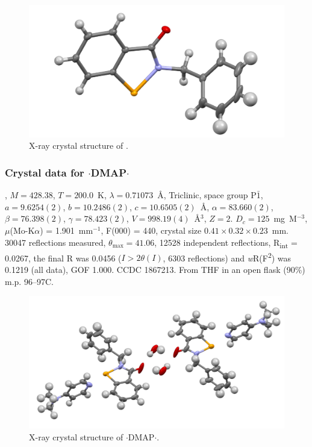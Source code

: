 \begin{refsection}
\begin{figure}
  \includegraphics[width=0.6\linewidth]{Figures/ebs-bn-xtal.pdf}
  \caption{X-ray crystal structure of \texorpdfstring{}{C14H11NOSe}.}
\end{figure}

\subsubsection{Crystal data for \texorpdfstring{$\cdot$DMAP$\cdot$}{C21H21N3OSe.(H2O)}}
, $M=428.38$, $T=200.0$~K, $\lambda=0.71073$~\AA, Triclinic, space group P$\bar{1}$, $a = 9.6254(2)$, $b = 10.2486(2)$, $c = 10.6505(2)$~\AA, $\alpha = 83.660(2)$\degree, $\beta = 76.398(2)$\degree, $\gamma = 78.423(2)$\degree, $V = 998.19(4)$~\AA$^{3}$, $Z = 2$.
$D_{c}= 125$~mg~M$^{-3}$, $\mu$(Mo-K$\alpha$) = 1.901~mm$^{-1}$, F(000) = 440, crystal size $0.41 \times 0.32 \times 0.23$~mm.
30047 reflections measured, $\theta_{\mathrm{max}} = 41.06$\degree, 12528 independent reflections, R\textsubscript{int} = 0.0267, the final R was 0.0456 ($I > 2\theta(I)$, 6303 reflections) and \emph{w}R(F\textsuperscript{2}) was 0.1219 (all data), GOF 1.000.
CCDC 1867213.
From THF in an open flask (90\%) m.p. 96--97\degree C.

\begin{figure}
  \includegraphics[width=0.6\linewidth]{Figures/ebs-bn-dmap-hydrate-xtal.pdf}
  \caption{X-ray crystal structure of \texorpdfstring{$\cdot$DMAP$\cdot$}{C21H21N3OSe.(H2O)}.}
\end{figure}


\end{refsection}
